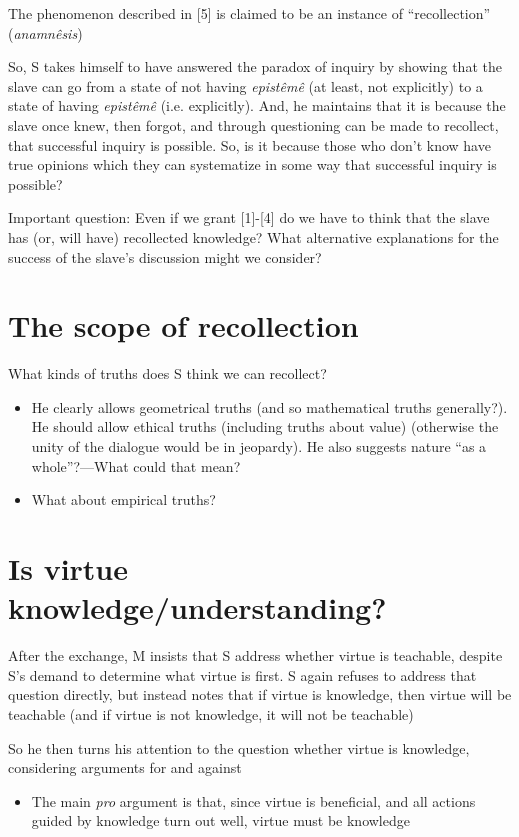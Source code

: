 \documentclass[10 pt]{article}
\begin{document}
\noindent [6] The phenomenon described in [5] is claimed to be an instance of ``recollection'' (\emph{anamn\^{e}sis})
\vspace*{2mm}

\noindent So, S takes himself to have answered the paradox of inquiry by showing that the slave can go from a state of not having \emph{epist\^{e}m\^{e}} (at least, not explicitly) to a state of having \emph{epist\^{e}m\^{e}} (i.e. explicitly). And, he maintains that it is because the slave once knew, then forgot, and through questioning can be made to recollect, that successful inquiry is possible. So, is it because those who don't know have true opinions which they can systematize in some way that successful inquiry is possible?
\vspace*{2mm}

\noindent Important question: Even if we grant [1]-[4] do we have to think that the slave has (or, will have) recollected knowledge? What alternative explanations for the success of the slave's discussion might we consider?

\section*{The scope of recollection}

\noindent What kinds of truths does S think we can recollect?

\begin{itemize}\item{He clearly allows geometrical truths (and so mathematical truths generally?). He should allow ethical truths (including truths about value) (otherwise the unity of the dialogue would be in jeopardy). He also suggests nature ``as a whole''?---What could that mean?}\item{What about empirical truths?}\end{itemize}

\section*{Is virtue knowledge/understanding?}

After the exchange, M insists that S address whether virtue is teachable, despite S's demand to determine what virtue is first. S again refuses to address that question directly, but instead notes that if virtue is knowledge, then virtue will be teachable (and if virtue is not knowledge, it will not be teachable)

So he then turns his attention to the question whether virtue is knowledge, considering arguments for and against
\begin{itemize}\item{The main \emph{pro} argument is that, since virtue is beneficial, and all actions guided by knowledge turn out well, virtue must be knowledge}\end{itemize}
\end{document}
